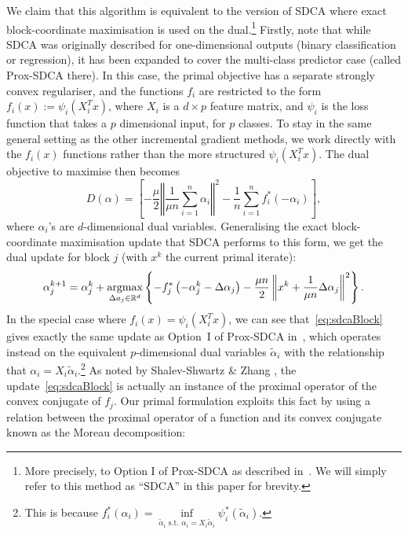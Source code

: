 \documentclass{article}
\newcommand{\argmax}{\operatornamewithlimits{argmax}}
\begin{document}
We claim that this algorithm is equivalent to the version of SDCA where exact block-coordinate maximisation is used on the dual.\footnote{More precisely, to Option I of Prox-SDCA as described in~\cite[Figure 1]{sdca-accel}. We will simply refer to this method as ``SDCA'' in this paper for brevity.} Firstly, note that while SDCA was originally described for one-dimensional outputs (binary classification or regression), it has been expanded to cover the multi-class predictor case \citep{sdca-accel} (called Prox-SDCA there). In this case, the primal objective has a separate strongly convex regulariser, and the functions $f_i$ are restricted to the form $f_{i}(x) :=\psi_{i}(X_{i}^{T}x)$, where $X_{i}$ is a $d \times p$ feature matrix, and $\psi_{i}$ is the loss function that takes a $p$ dimensional input, for $p$ classes. To stay in the same general setting as the other incremental gradient methods, we work directly with the $f_i(x)$ functions rather than the more structured $\psi_{i}(X_{i}^{T}x)$. The dual objective to maximise then becomes 
\[ 
D(\alpha) = \left[
-\frac{\mu}{2} \left\Vert \frac{1}{\mu n} \sum_{i=1}^n \alpha_i \right\Vert^2 - \frac{1}{n} \sum_{i=1}^n f_i^*(-\alpha_i) \right],
\] where $\alpha_i$'s are $d$-dimensional dual variables. Generalising the exact block-coordinate maximisation update that SDCA performs to this form, we get the dual update for block $j$ (with $x^k$ the current primal iterate): 
\begin{equation} \label{eq:sdcaBlock}
\alpha_{j}^{k+1}=\alpha_{j}^{k}+\argmax_{\Delta a_{j} \in \mathbb{R}^d}\left\{ -f_{j}^{*}\left(-\alpha_{j}^{k}-\Delta\alpha_{j}\right)-\frac{\mu n}{2}\left\Vert x^{k}+\frac{1}{\mu n}\Delta\alpha_{j}\right\Vert ^{2} \right\}.
\end{equation}
In the special case where $f_{i}(x) =\psi_{i}(X_{i}^{T}x)$, we can see that~\eqref{eq:sdcaBlock} gives exactly the same update as Option~I of Prox-SDCA in~\cite[Figure 1]{sdca-accel}, which operates instead on the equivalent $p$-dimensional dual variables $\tilde{\alpha}_i$ with the relationship that $\alpha_i = X_i \tilde{\alpha}_i$.\footnote{This is because $f_i^*(\alpha_i) = \inf\limits_{\tilde{\alpha}_i \textrm{ s.t. } \alpha_i = X_i \tilde{\alpha}_i} \psi_i^*(\tilde{\alpha}_i)$.} As noted by Shalev-Shwartz \& Zhang  \citep{sdca-accel}, the update~\eqref{eq:sdcaBlock} is actually an instance of the proximal operator of the convex conjugate of $f_j$. Our primal formulation exploits this fact by using a relation between the proximal operator of a function and its convex conjugate known as the Moreau decomposition:
\end{document}
